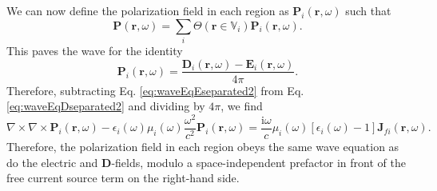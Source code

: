 We can now define the polarization field in each region as $\mathbf{P}_i(\mathbf{r},\omega)$ such that
\begin{equation}
\mathbf{P}(\mathbf{r},\omega) = \sum_i\Theta(\mathbf{r}\in\mathbb{V}_i)\mathbf{P}_i(\mathbf{r},\omega).
\end{equation}
This paves the wave for the identity
\begin{equation}
\mathbf{P}_i(\mathbf{r},\omega) = \frac{\mathbf{D}_i(\mathbf{r},\omega) - \mathbf{E}_i(\mathbf{r},\omega)}{4\pi}.
\end{equation}
Therefore, subtracting Eq. \eqref{eq:waveEqEseparated2} from Eq. \eqref{eq:waveEqDseparated2} and dividing by $4\pi$, we find
\begin{equation}
\nabla\times\nabla\times\mathbf{P}_i(\mathbf{r},\omega) - \epsilon_i(\omega)\mu_i(\omega)\frac{\omega^2}{c^2}\mathbf{P}_i(\mathbf{r},\omega) = \frac{\mathrm{i}\omega}{c}\mu_i(\omega)\left[\epsilon_i(\omega) - 1\right]\mathbf{J}_{fi}(\mathbf{r},\omega).
\end{equation}
Therefore, the polarization field in each region obeys the same wave equation as do the electric and $\mathbf{D}$-fields, modulo a space-independent prefactor in front of the free current source term on the right-hand side.